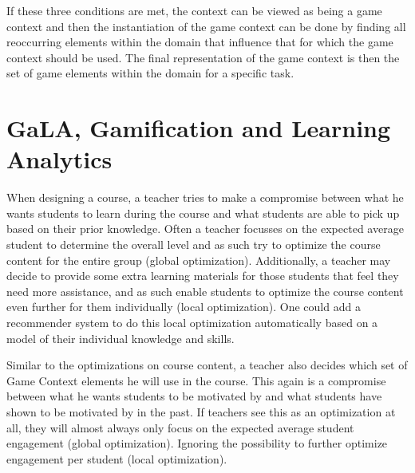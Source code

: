 \documentclass[11pt]{article}
\begin{document}
If these three conditions are met, the context can be viewed as being a game context and then the instantiation of the game context can be done by finding all reoccurring elements within the domain that influence that for which the game context should be used. The final representation of the game context is then the set of game elements within the domain for a specific task.

\section{GaLA, Gamification and Learning Analytics}\label{sec:gala}
When designing a course, a teacher tries to make a compromise between what he wants students to learn during the course and what students are able to pick up based on their prior knowledge. Often a teacher focusses on the expected average student to determine the overall level and as such try to optimize the course content for the entire group (global optimization). Additionally, a teacher may decide to provide some extra learning materials for those students that feel they need more assistance, and as such enable students to optimize the course content even further for them individually (local optimization). One could add a recommender system to do this local optimization automatically based on a model of their individual knowledge and skills.

Similar to the optimizations on course content, a teacher also decides which set of Game Context elements he will use in the course. This again is a compromise between what he wants students to be motivated by and what students have shown to be motivated by in the past. If teachers see this as an optimization at all, they will almost always only focus on the expected average student engagement (global optimization). Ignoring the possibility to further optimize engagement per student (local optimization).
\end{document}
